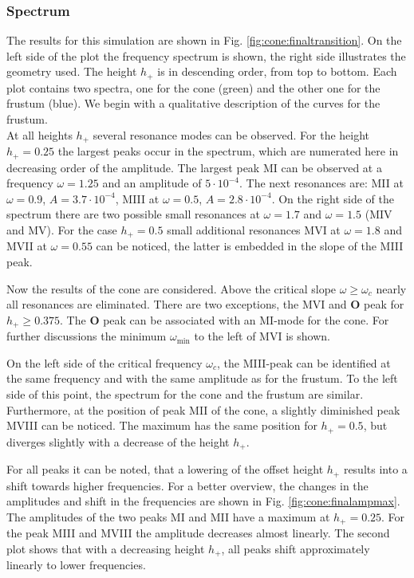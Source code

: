 \subsubsection{Spectrum}

The results for this simulation are shown in Fig. \ref{fig:cone:finaltransition}.
On the left side of the plot  the frequency spectrum is shown, the right side illustrates the geometry used.
The height $h_+$ is in descending order, from top to bottom.
Each plot contains two spectra, one for the cone (green)  and the other one for the frustum (blue).
We begin with a qualitative description of the curves for the frustum.\\
At all heights $h_+$ several resonance modes can be observed. For the height ${h_+=0.25}$
the largest peaks occur in the spectrum, which are numerated here in decreasing order of the amplitude.
The largest peak M\RN{1} can be observed at a frequency $\omega=1.25$ and an amplitude of $5\cdot10^{-4}$.
The next resonances are: M\RN{2} at $\omega=0.9$, $A=3.7\cdot10^{-4}$, M\RN{3} at $\omega=0.5$,  $A=2.8\cdot10^{-4}$.
On the right side of the spectrum there are two possible small resonances at $\omega=1.7$ and $\omega=1.5$ (M\RN{4} and M\RN{5}).
For the case $h_+=0.5$  small additional resonances  M\RN{6} at $\omega=1.8$ and M\RN{7} at $\omega=0.55$ can be noticed,
the latter is embedded in the slope of the M\RN{3} peak.

Now the results of the cone are considered.
Above the critical slope $\omega\geq\omega_c$ nearly all resonances are eliminated.
There are  two exceptions, the M\RN{6} and \textbf{O} peak for $h_+\geq0.375$.
The \textbf{O} peak can be associated with an M\RN{1}-mode for the cone.
For further discussions the minimum $\omega_{\text{min}}$ to the left of M\RN{6} is shown.

On the left side of the critical frequency $\omega_c$,  the M\RN{3}-peak can be identified
at the same frequency and with the same amplitude as for the frustum. To the left side of this point, the spectrum for
the cone and the frustum are similar.
Furthermore, at the position of peak M\RN{2} of the cone, a slightly diminished peak M\RN{8} can be noticed.
The maximum has the same position for $h_+=0.5$, but diverges slightly with a decrease of the height $h_+$.

For all peaks  it can be noted, that a lowering of the offset height $h_+$ results
into a shift towards higher frequencies. %
For a better overview, the changes in the amplitudes and shift in the frequencies are shown in
Fig. \ref{fig:cone:finalampmax}. %
The amplitudes of the two peaks M\RN{1} and M\RN{2} have a maximum at $h_+= 0.25$. For the peak M\RN{3} and M\RN{8} the amplitude decreases almost linearly.
The second plot shows that with a decreasing height $h_+$,
all peaks shift approximately linearly to lower frequencies.

